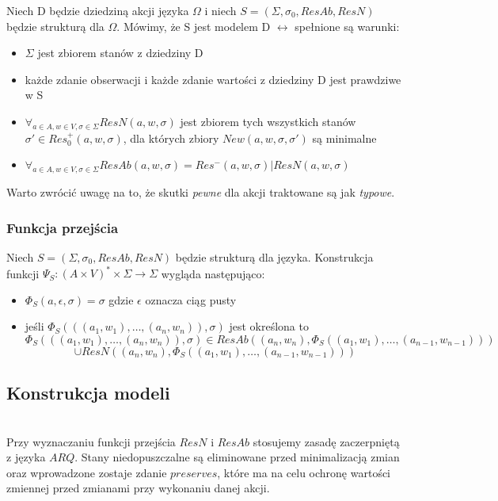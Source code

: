 \documentclass{article}
\begin{document}
Niech D będzie dziedziną akcji języka $\Omega$ i niech $S=(\Sigma, \sigma_{0}, ResAb, ResN)$ będzie strukturą dla $\Omega$. Mówimy, że S jest modelem D $\leftrightarrow$ spełnione są warunki:
\begin{itemize}
	\item $\Sigma$ jest zbiorem stanów z dziedziny D
	\item każde zdanie obserwacji i każde zdanie wartości z dziedziny D jest prawdziwe w S
	\item $\forall_{ a \in A, w \in V, \sigma \in \Sigma } ResN(a, w, \sigma)$ jest zbiorem tych wszystkich stanów $\sigma' \in Res_{0}^{+}(a, w, \sigma)$, dla których zbiory $New(a, w, \sigma, \sigma')$ są minimalne
	\item $\forall_{a \in A, w \in V, \sigma \in \Sigma} ResAb(a, w, \sigma) = Res^{-}(a, w, \sigma) | ResN(a, w, \sigma)$
\end{itemize}
Warto zwrócić uwagę na to, że skutki \textit{pewne} dla akcji traktowane są jak \textit{typowe}.

\subsubsection{Funkcja przejścia}
Niech $S=(\Sigma,\sigma_{0},ResAb,ResN)$ będzie strukturą dla języka. Konstrukcja funkcji $\Psi_{S} : (A \times V)^{*} \times \Sigma \to \Sigma$ wygląda następująco:
\begin{itemize}
	\item $\Phi_{S}(a,\epsilon,\sigma)=\sigma$ gdzie $\epsilon$ oznacza ciąg pusty
	\item jeśli $\Phi_{S}(((a_{1}, w_{1}), \dots, (a_{n}, w_{n})),\sigma)$ jest określona to
	\[\Phi_{S}(((a_{1}, w_{1}), \dots, (a_{n}, w_{n})),\sigma) \in ResAb((a_{n}, w_{n}), \Phi_{S}((a_{1}, w_{1}),\dots,(a_{n-1}, w_{n-1}))) \]
	\[ \cup ResN((a_{n}, w_{n}), \Phi_{S}((a_{1}, w_{1}),\dots,(a_{n-1}, w_{n-1})))\]
\end{itemize}
\subsection{Konstrukcja modeli}\mbox{}\\
Przy wyznaczaniu funkcji przejścia $ResN$ i $ResAb$ stosujemy zasadę zaczerpniętą z języka $ARQ$. Stany niedopuszczalne są eliminowane przed minimalizacją zmian oraz wprowadzone zostaje zdanie $preserves$, które ma na celu ochronę wartości zmiennej przed  zmianami przy wykonaniu danej akcji.\\
\end{document}
